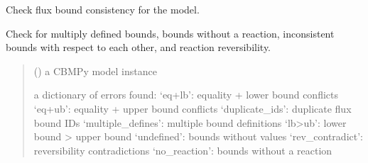 \documentclass[letterpaper,12pt,english]{sphinxmanual}
\begin{document}
\begin{fulllineitems}
\label{\detokenize{api/core:cbmpy.CBTools.checkFluxBoundConsistency}}
\pysigstartsignatures
\pysiglinewithargsret
{}
{}
{}
\pysigstopsignatures
\sphinxAtStartPar
Check flux bound consistency for the model.

\sphinxAtStartPar
Check for multiply defined bounds, bounds without a reaction, inconsistent
bounds with respect to each other, and reaction reversibility.
\begin{quote}\begin{description}
\sphinxAtStartPar
{} () \textendash{} a CBMPy model instance

\sphinxAtStartPar
{} \textendash{} a dictionary of errors found:
\sphinxhyphen{} ‘eq+lb’: equality + lower bound conflicts
\sphinxhyphen{} ‘eq+ub’: equality + upper bound conflicts
\sphinxhyphen{} ‘duplicate\_ids’: duplicate flux bound IDs
\sphinxhyphen{} ‘multiple\_defines’: multiple bound definitions
\sphinxhyphen{} ‘lb\textgreater{}ub’: lower bound \textgreater{} upper bound
\sphinxhyphen{} ‘undefined’: bounds without values
\sphinxhyphen{} ‘rev\_contradict’: reversibility contradictions
\sphinxhyphen{} ‘no\_reaction’: bounds without a reaction

\end{description}\end{quote}

\end{fulllineitems}

\end{document}
